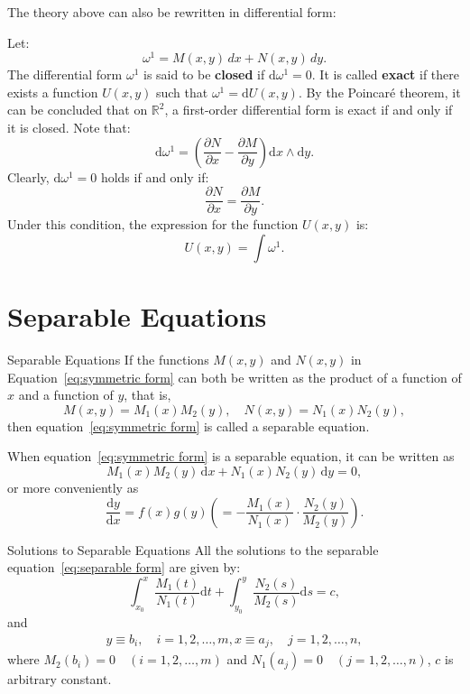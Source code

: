 \documentclass[11pt]{../../TexTemplate/elegantbook}
\begin{document}
\vspace{0.7cm}
The theory above can also be rewritten in differential form:

Let:
\[
\omega^1 = M(x, y) \, dx + N(x, y) \, dy.
\]
The differential form \( \omega^1 \) is said to be \textbf{closed} if \( \mathrm{d}\omega^1 = 0 \). 
It is called \textbf{exact} if there exists a function \( U(x, y) \) such that \( \omega^1 = \mathrm{d}U(x, y) \). 
By the Poincaré theorem, it can be concluded that on \( \mathbb{R}^2 \), 
a first-order differential form is exact if and only if it is closed.
Note that:
\[
\mathrm{d}\omega^1 = \left( \frac{\partial N}{\partial x} - \frac{\partial M}{\partial y} \right) \mathrm{d}x \wedge \mathrm{d}y.
\]
Clearly, \( \mathrm{d}\omega^1 = 0 \) holds if and only if:
\[
\frac{\partial N}{\partial x} = \frac{\partial M}{\partial y}.
\]
Under this condition, the expression for the function \( U(x, y) \) is:
\[
U(x, y) = \int \omega^1.
\]


\section{Separable Equations}
\begin{definition}{Separable Equations}
    If the functions \(M(x, y)\) and \(N(x, y)\) in Equation~\eqref{eq:symmetric form} can both be written as 
    the product of a function of \(x\) and a function of \(y\), that is,
    \[
    M(x, y) = M_1(x) M_2(y), \quad N(x, y) = N_1(x) N_2(y),
    \]
    then equation~\eqref{eq:symmetric form} is called a separable equation.

    When equation~\eqref{eq:symmetric form} is a separable equation, it can be written as
    \begin{equation}\label{eq:separable form}
        M_1(x) M_2(y) \, \mathrm{d}x + N_1(x) N_2(y) \, \mathrm{d}y = 0,
    \end{equation}
    or more conveniently as
    \begin{equation}\label{eq:separable form 2}
        \frac{\mathrm{d}y}{\mathrm{d}x} = f(x)g(y) \left(= -\frac{M_1(x)}{N_1(x)} \cdot \frac{N_2(y)}{M_2(y)}\right).
    \end{equation}
\end{definition}

\begin{theorem}{Solutions to Separable Equations}
    All the solutions to the separable equation~\eqref{eq:separable form} are given by:
    \[
    \int_{x_{0}}^{x}  \frac{M_{1}(t)}{N_{1}(t)}\mathrm{d}t + \int_{y_{0}}^{y} \frac{N_{2}(s)}{M_{2}(s)}\mathrm{d}s = c,
    \]
    and 
    \begin{gather*}
        y \equiv b_{i}, \quad i = 1, 2, \ldots, m, 
        x \equiv a_{j}, \quad j = 1, 2, \ldots, n,
    \end{gather*}
    where \(M_{2}(b_{i})=0\quad(i=1,2,\ldots,m)\) and \(N_{1}(a_{j})=0\quad(j=1,2,\ldots,n)\), \(c\) is arbitrary constant.
\end{theorem}
\end{document}
